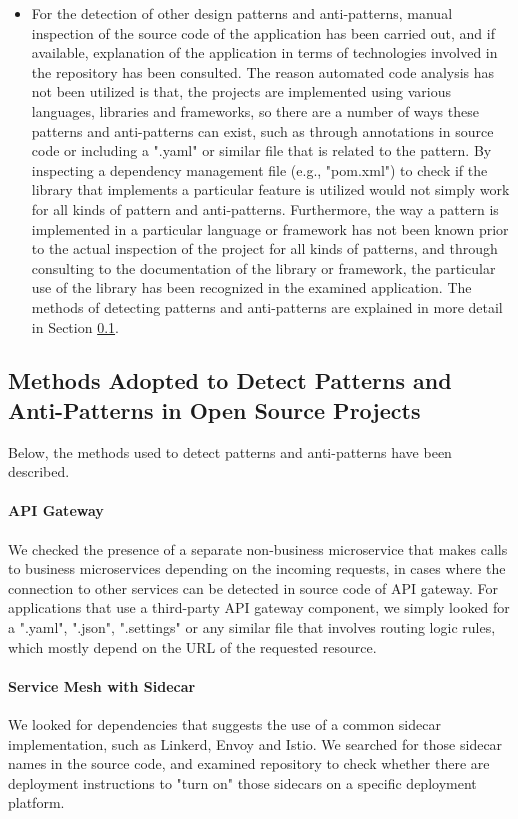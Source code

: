 \documentclass{Configuration_Files/PoliMi3i_thesis}
\begin{document}
\begin{itemize}
    \item For the detection of other design patterns and anti-patterns, manual inspection of the source code of the application has been carried out, and if available, explanation of the application in terms of technologies involved in the repository has been consulted.
    The reason automated code analysis has not been utilized is that, the projects are implemented using various languages, libraries and frameworks, so there are a number of ways these patterns and anti-patterns can exist, such as through annotations in source code or including a ".yaml" or similar file that is related to the pattern.
    By inspecting a dependency management file (e.g., "pom.xml") to check if the library that implements a particular feature is utilized would not simply work for all kinds of pattern and anti-patterns.
    Furthermore, the way a pattern is implemented in a particular language or framework has not been known prior to the actual inspection of the project for all kinds of patterns, and through consulting to the documentation of the library or framework, the particular use of the library has been recognized in the examined application.
    The methods of detecting patterns and anti-patterns are explained in more detail in Section \ref{subsec:adopted_method_OS}.
\end{itemize}
    
\subsection{Methods Adopted to Detect Patterns and Anti-Patterns in Open Source Projects}
\label{subsec:adopted_method_OS}

Below, the methods used to detect patterns and anti-patterns have been described.

\paragraph{API Gateway} We checked the presence of a separate non-business microservice that makes calls to business microservices depending on the incoming requests, in cases where the connection to other services can be detected in source code of API gateway.
For applications that use a third-party API gateway component, we simply looked for a ".yaml", ".json", ".settings" or any similar file that involves routing logic rules, which mostly depend on the URL of the requested resource.

\paragraph{Service Mesh with Sidecar} We looked for dependencies that suggests the use of a common sidecar implementation, such as Linkerd, Envoy and Istio.
We searched for those sidecar names in the source code, and examined repository to check whether there are deployment instructions to "turn on" those sidecars on a specific deployment platform.
\end{document}
